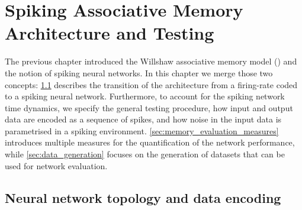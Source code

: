 \chapter{Spiking Associative Memory Architecture and Testing}
\label{chp:spinam}

The previous chapter introduced the Willshaw associative memory model (\BiNAM) and the notion of spiking neural networks. In this chapter we merge those two concepts: \cref{sec:neural_network_topology} describes the transition of the \BiNAM architecture from a firing-rate coded to a spiking neural network. Furthermore, to account for the spiking network time dynamics, we specify the general testing procedure, how input and output data are encoded as a sequence of spikes, and how noise in the input data is parametrised in a spiking environment. \cref{sec:memory_evaluation_measures} introduces multiple measures for the quantification of the network performance, while \cref{sec:data_generation} focuses on the generation of datasets that can be used for network evaluation.

\section{Neural network topology and data encoding}
\label{sec:neural_network_topology}

